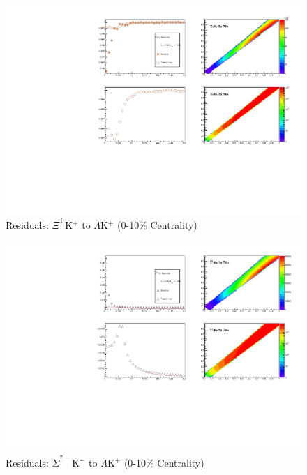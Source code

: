 \documentclass[../AnalysisNoteJBuxton.tex]{subfiles}
\begin{document}
\begin{figure}[h]
  \centering
  \includegraphics[width=\textwidth]{9_AdditionalFigures/Figures/Residuals/ALamKchP/Residuals_ALamKchP_0010_AXiKchP_MomResCrctn_NonFlatBgdCrctn_ResidualsIncluded_UsingCoulombOnlyInterpCfs.pdf}
  \caption[Residuals: $\bar{\Xi}^{+}$K$^{+}$ to $\bar{\Lambda}$K$^{+}$ (0-10\% Centrality)]{Residuals: $\bar{\Xi}^{+}$K$^{+}$ to $\bar{\Lambda}$K$^{+}$ (0-10\% Centrality)}
  \label{fig:Res_ALamKchP_0010_AXiCKchP}
\end{figure}


\begin{figure}[h]
  \centering
  \includegraphics[width=\textwidth]{9_AdditionalFigures/Figures/Residuals/ALamKchP/Residuals_ALamKchP_0010_ASigStMKchP_MomResCrctn_NonFlatBgdCrctn_ResidualsIncluded_UsingCoulombOnlyInterpCfs.pdf}
  \caption[Residuals: $\bar{\Sigma}^{*-}$K$^{+}$ to $\bar{\Lambda}$K$^{+}$ (0-10\% Centrality)]{Residuals: $\bar{\Sigma}^{*-}$K$^{+}$ to $\bar{\Lambda}$K$^{+}$ (0-10\% Centrality)}
  \label{fig:Res_ALamKchP_0010_ASigStMKchP}
\end{figure}
\end{document}
